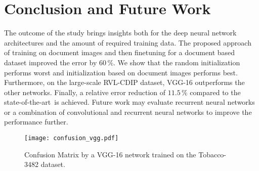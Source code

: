 \documentclass[conference]{IEEEtran}
\newcommand*{\sota}		{state-of-the-art\ }
\begin{document}
  
\section{Conclusion and Future Work}




The outcome of the study brings insights both for the deep neural network architectures and the amount of required training data. The proposed approach of training on document images and then finetuning for a document based dataset improved the error by $60\,\%$.
We show that the random initialization performs worst and initialization based on document images performs best.
Furthermore, on the large-scale RVL-CDIP dataset, VGG-16 outperforms the other networks.
Finally, a relative error reduction of $11.5\,\%$ compared to the \sota is achieved. 
Future work may evaluate recurrent neural networks or a combination of convolutional and recurrent neural networks to improve the performance further.







\begin{figure}
        \centering
        \texttt{[image: confusion\_vgg.pdf]}
        \caption{Confusion Matrix by a VGG-16 network trained on the Tobacco-3482 dataset.}
\label{fig:confusion}
\end{figure}
 
\ifCLASSOPTIONcaptionsoff
  \newpage
\fi




\end{document}

